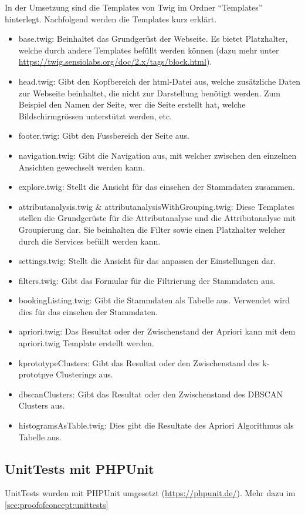 In der Umsetzung sind die Templates von Twig im Ordner "`Templates"' hinterlegt. Nachfolgend werden die Templates kurz erklärt.
\begin{itemize}
	\item base.twig: Beinhaltet das Grundgerüst der Webseite. Es bietet Platzhalter, welche durch andere Templates befüllt werden können (dazu mehr unter \url{https://twig.sensiolabs.org/doc/2.x/tags/block.html}).
	\item head.twig: Gibt den Kopfbereich der \gls{html}-Datei aus, welche zusätzliche Daten zur Webseite beinhaltet, die nicht zur Darstellung benötigt werden. Zum Beispiel den Namen der Seite, wer die Seite erstellt hat, welche Bildschirmgrössen unterstützt werden, etc.
	\item footer.twig: Gibt den Fussbereich der Seite aus. 
	\item navigation.twig: Gibt die Navigation aus, mit welcher zwischen den einzelnen Ansichten gewechselt werden kann.
	\item explore.twig: Stellt die Ansicht für das einsehen der Stammdaten zusammen. 
	\item attributanalysis.twig \& attributanalysisWithGrouping.twig: Diese Templates stellen die Grundgerüste für die Attributanalyse und die Attributanalyse mit Groupierung dar. Sie beinhalten die Filter sowie einen Platzhalter welcher durch die Services befüllt werden kann.
	\item settings.twig: Stellt die Ansicht für das anpassen der Einstellungen dar. 
	\item filters.twig: Gibt das Formular für die Filtrierung der Stammdaten aus.
	\item bookingListing.twig: Gibt die Stammdaten als Tabelle aus. Verwendet wird dies für das einsehen der Stammdaten.
	\item apriori.twig: Das Resultat oder der Zwischenstand der Apriori kann mit dem apriori.twig Template erstellt werden.
	\item kprototypeClusters: Gibt das Resultat oder den Zwischenstand des k-prototpye Clusterings aus.
	\item dbscanClusters: Gibt das Resultat oder den Zwischenstand des DBSCAN Clusters aus.
	\item histogramsAsTable.twig: Dies gibt die Resultate des Apriori Algorithmus als Tabelle aus. 
\end{itemize}

\subsection{UnitTests mit PHPUnit}
\label{sec:proofofconcept:externebibliotheken:phpunit}
UnitTests wurden mit PHPUnit umgesetzt (\url{https://phpunit.de/}). Mehr dazu im \cref{sec:proofofconcept:unittests} 

